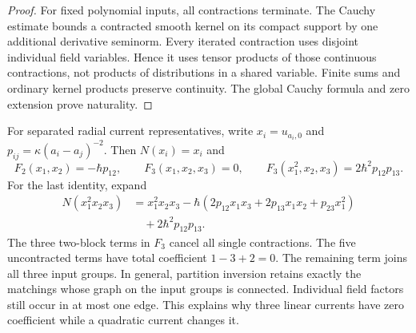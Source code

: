 \begin{proof}
For fixed polynomial inputs, all contractions terminate.
The Cauchy estimate bounds a contracted smooth kernel on its
compact support by one additional derivative seminorm.
Every iterated contraction uses disjoint individual field variables.
Hence it uses tensor products of those continuous contractions,
not products of distributions in a shared variable.
Finite sums and ordinary kernel products preserve continuity.
The global Cauchy formula and zero extension prove naturality.
\end{proof}

For separated radial current representatives, write $x_i=u_{a_i,0}$
and $p_{ij}=\kappa(a_i-a_j)^{-2}$.  Then $N(x_i)=x_i$ and
\[
 F_2(x_1,x_2)=-\hbar p_{12},\qquad
 F_3(x_1,x_2,x_3)=0,
 \qquad F_3(x_1^2,x_2,x_3)=2\hbar^2p_{12}p_{13}.
\]
For the last identity, expand
\[
\begin{split}
 N(x_1^2x_2x_3)
 &=x_1^2x_2x_3
 -\hbar(2p_{12}x_1x_3+2p_{13}x_1x_2+p_{23}x_1^2)\\
 &\quad+2\hbar^2p_{12}p_{13}.
\end{split}
\]
The three two-block terms in $F_3$ cancel all single contractions.
The five uncontracted terms have total coefficient $1-3+2=0$.
The remaining term joins all three input groups.
In general, partition inversion retains exactly the matchings whose
graph on the input groups is connected.  Individual field factors
still occur in at most one edge.  This explains why three linear
currents have zero coefficient while a quadratic current changes it.

